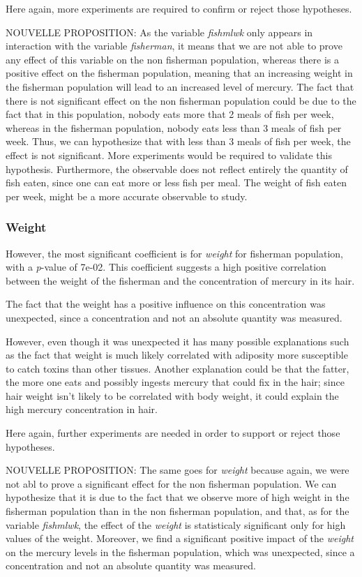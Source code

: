 \documentclass[12pt,]{article}
\begin{document}
Here again, more experiments are required to confirm or reject those
hypotheses.

NOUVELLE PROPOSITION: As the variable \emph{fishmlwk} only appears in
interaction with the variable \emph{fisherman}, it means that we are not
able to prove any effect of this variable on the non fisherman
population, whereas there is a positive effect on the fisherman
population, meaning that an increasing weight in the fisherman
population will lead to an increased level of mercury. The fact that
there is not significant effect on the non fisherman population could be
due to the fact that in this population, nobody eats more that 2 meals
of fish per week, whereas in the fisherman population, nobody eats less
than 3 meals of fish per week. Thus, we can hypothesize that with less
than 3 meals of fish per week, the effect is not significant. More
experiments would be required to validate this hypothesis. Furthermore,
the observable does not reflect entirely the quantity of fish eaten,
since one can eat more or less fish per meal. The weight of fish eaten
per week, might be a more accurate observable to study.

\subsubsection{Weight}\label{weight}

However, the most significant coefficient is for \emph{weight} for
fisherman population, with a \emph{p}-value of 7e-02. This coefficient
suggests a high positive correlation between the weight of the fisherman
and the concentration of mercury in its hair.

The fact that the weight has a positive influence on this concentration
was unexpected, since a concentration and not an absolute quantity was
measured.

However, even though it was unexpected it has many possible explanations
such as the fact that weight is much likely correlated with adiposity
more susceptible to catch toxins than other tissues. Another explanation
could be that the fatter, the more one eats and possibly ingests mercury
that could fix in the hair; since hair weight isn't likely to be
correlated with body weight, it could explain the high mercury
concentration in hair.

Here again, further experiments are needed in order to support or reject
those hypotheses.

NOUVELLE PROPOSITION: The same goes for \emph{weight} because again, we
were not abl to prove a significant effect for the non fisherman
population. We can hypothesize that it is due to the fact that we
observe more of high weight in the fisherman population than in the non
fisherman population, and that, as for the variable \emph{fishmlwk}, the
effect of the \emph{weight} is statisticaly significant only for high
values of the weight. Moreover, we find a significant positive impact of
the \emph{weight} on the mercury levels in the fisherman population,
which was unexpected, since a concentration and not an absolute quantity
was measured.
\end{document}
